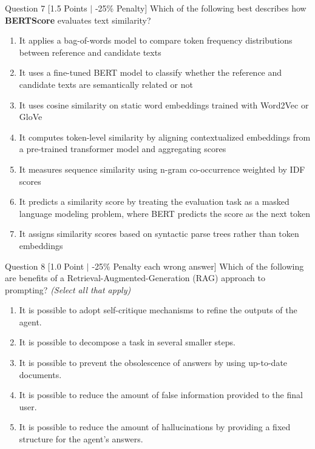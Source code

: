 \documentclass[11pt,a4paper]{article}
\begin{document}
\begin{questionbox}{Question 7 \hfill [1.5 Points $\vert$ -25\% Penalty]}
Which of the following best describes how \textbf{BERTScore} evaluates text similarity?
\begin{enumerate}[label=(\alph*)]
    \item It applies a bag-of-words model to compare token frequency distributions between reference and candidate texts
    \item It uses a fine-tuned BERT model to classify whether the reference and candidate texts are semantically related or not
    \item It uses cosine similarity on static word embeddings trained with Word2Vec or GloVe
    \item It computes token-level similarity by aligning contextualized embeddings from a pre-trained transformer model and aggregating scores
    \item It measures sequence similarity using n-gram co-occurrence weighted by IDF scores
    \item It predicts a similarity score by treating the evaluation task as a masked language modeling problem, where BERT predicts the score as the next token
    \item It assigns similarity scores based on syntactic parse trees rather than token embeddings
\end{enumerate}
\end{questionbox}

\bigskip

\newpage
\begin{questionbox}{Question 8 \hfill [1.0 Point $\vert$ -25\% Penalty each wrong answer]}
Which of the following are benefits of a Retrieval-Augmented-Generation (RAG) approach to prompting? \textit{(Select all that apply)}
\begin{enumerate}[label=(\alph*)]
    \item It is possible to adopt self-critique mechanisms to refine the outputs of the agent.
    \item It is possible to decompose a task in several smaller steps.
    \item It is possible to prevent the obsolescence of answers by using up-to-date documents.
    \item It is possible to reduce the amount of false information provided to the final user.
    \item It is possible to reduce the amount of hallucinations by providing a fixed structure for the agent's answers.
\end{enumerate}
\end{questionbox}
\end{document}
